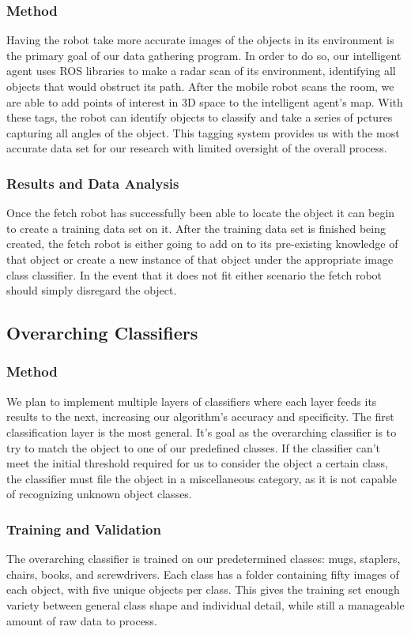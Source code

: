 \documentclass[draftclsnofoot, onecolumn, 10pt, compsoc]{IEEEtran}
\begin{document}
			\subsubsection{Method}
				Having the robot take more accurate images of the objects in its environment is the primary goal of our data gathering program. In order to do so, our intelligent agent uses ROS libraries to make a radar scan of its environment, identifying all objects that would obstruct its path. After the mobile robot scans the room, we are able to add points of interest in 3D space to the intelligent agent's map. With these tags, the robot can identify objects to classify and take a series of pctures capturing all angles of the object. This tagging system provides us with the most accurate data set for our research with limited oversight of the overall process.

			\subsubsection{Results and Data Analysis}
				Once the fetch robot has successfully been able to locate the object it can begin to create a training data set on it. After the training data set is finished being created, the fetch robot is either going to add on to its pre-existing knowledge of that object or create a new instance of that object under the appropriate image class classifier. In the event that it does not fit either scenario the fetch robot should simply disregard the object.

		\subsection{Overarching Classifiers}
			\subsubsection{Method}
				We plan to implement multiple layers of classifiers where each layer feeds its results to the next, increasing our algorithm’s accuracy and specificity. The first classification layer is the most general. It’s goal as the overarching classifier is to try to match the object to one of our predefined classes. If the classifier can’t meet the initial threshold required for us to consider the object a certain class, the classifier must file the object in a miscellaneous category, as it is not capable of recognizing unknown object classes.

			\subsubsection{Training and Validation}
				The overarching classifier is trained on our predetermined classes: mugs, staplers, chairs, books, and screwdrivers. Each class has a folder containing fifty images of each object, with five unique objects per class. This gives the training set enough variety between general class shape and individual detail, while still a manageable amount of raw data to process.
\end{document}
